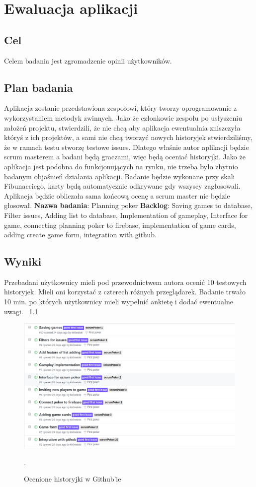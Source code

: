 \chapter{Ewaluacja aplikacji}

\section{Cel}

Celem badania jest zgromadzenie opinii użytkowników.

\section{Plan badania}

Aplikacja zostanie przedstawiona zespołowi,
który tworzy oprogramowanie z wykorzystaniem metodyk zwinnych.
Jako że członkowie zespołu po usłyszeniu założeń projektu, stwierdzili,
że nie chcą aby aplikacja ewentualnia zniszczyła któryś z ich projektów,
a sami nie chcą tworzyć nowych historyjek stwierdziliśmy,
że w ramach testu stworzę testowe issues.
Dlatego właśnie autor aplikacji będzie scrum masterem a badani będą graczami,
więc będą oceniać historyjki.
Jako że aplikacja jest podobna do funkcjonujących na rynku,
nie trzeba było zbytnio badanym objaśnień działania aplikacji.
Badanie będzie wykonane przy skali Fibunacciego,
karty będą automatycznie odkrywane gdy wszyscy zagłosowali.
 Aplikacja będzie obliczała sama końcową ocenę a scrum master nie będzie głosował.
 \textbf{Nazwa badania}: Planning poker
 \textbf{Backlog}: Saving games to database, Filter issues, Adding list to database,
 Implementation of gameplay, Interface for game, connecting planning poker to firebase,
implementation of game cards, adding create game form, integration with github.

\section{Wyniki}

Przebadani użytkownicy mieli pod przewodnictwem autora ocenić 10 testowych historyjek.
Mieli oni korzystać z czterech różnych przeglądarek.
Badanie trwało 10 min. po których użytkownicy mieli wypełnić ankietę i dodać ewentualne uwagi.
~\ref{rys:wynikBadania}
\begin{figure}
	\centering\includegraphics[width=.9\textwidth]{img/wynikBadania}
	\caption{Ocenione historyjki w Github'ie}.
	\label{rys:wynikBadania}
\end{figure}

